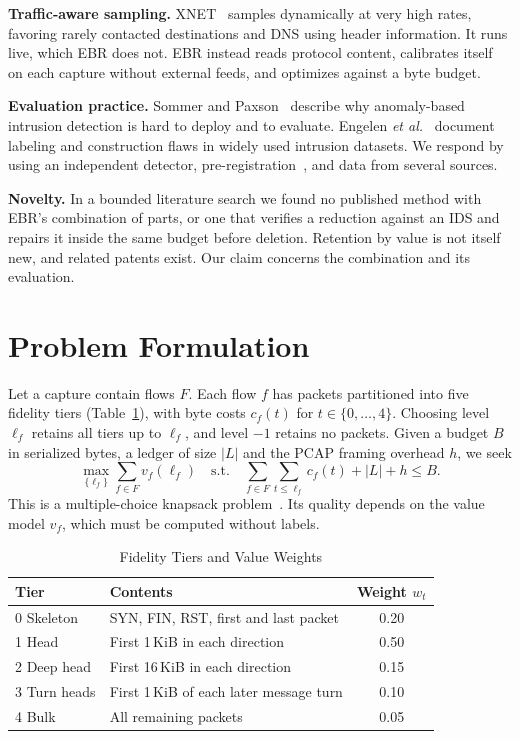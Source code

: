 \documentclass[conference]{IEEEtran}
\begin{document}
\textbf{Traffic-aware sampling.} XNET~\cite{xnet} samples dynamically at very high rates, favoring rarely contacted destinations and DNS using header information. It runs live, which EBR does not. EBR instead reads protocol content, calibrates itself on each capture without external feeds, and optimizes against a byte budget.

\textbf{Evaluation practice.} Sommer and Paxson~\cite{outside} describe why anomaly-based intrusion detection is hard to deploy and to evaluate. Engelen \emph{et al.}~\cite{troubleshooting} document labeling and construction flaws in widely used intrusion datasets. We respond by using an independent detector, pre-registration~\cite{prereg}, and data from several sources.

\textbf{Novelty.} In a bounded literature search we found no published method with EBR's combination of parts, or one that verifies a reduction against an IDS and repairs it inside the same budget before deletion. Retention by value is not itself new, and related patents exist. Our claim concerns the combination and its evaluation.

\section{Problem Formulation}
Let a capture contain flows $F$. Each flow $f$ has packets partitioned into five fidelity tiers (Table~\ref{tab:tiers}), with byte costs $c_f(t)$ for $t\in\{0,\dots,4\}$. Choosing level $\ell_f$ retains all tiers up to $\ell_f$, and level $-1$ retains no packets. Given a budget $B$ in serialized bytes, a ledger of size $|L|$ and the PCAP framing overhead $h$, we seek
\begin{equation}
\max_{\{\ell_f\}} \sum_{f\in F} v_f(\ell_f) \quad \text{s.t.} \quad \sum_{f\in F}\sum_{t\le \ell_f} c_f(t) + |L| + h \le B.
\label{eq:mckp}
\end{equation}
This is a multiple-choice knapsack problem~\cite{mckp}. Its quality depends on the value model $v_f$, which must be computed without labels.

\begin{table}[t]
\centering
\caption{Fidelity Tiers and Value Weights}
\label{tab:tiers}
\footnotesize
\begin{tabular}{@{}llc@{}}
\toprule
Tier & Contents & Weight $w_t$\\
\midrule
0 Skeleton & SYN, FIN, RST, first and last packet & 0.20\\
1 Head & First 1\,KiB in each direction & 0.50\\
2 Deep head & First 16\,KiB in each direction & 0.15\\
3 Turn heads & First 1\,KiB of each later message turn & 0.10\\
4 Bulk & All remaining packets & 0.05\\
\bottomrule
\end{tabular}
\end{table}
\end{document}
